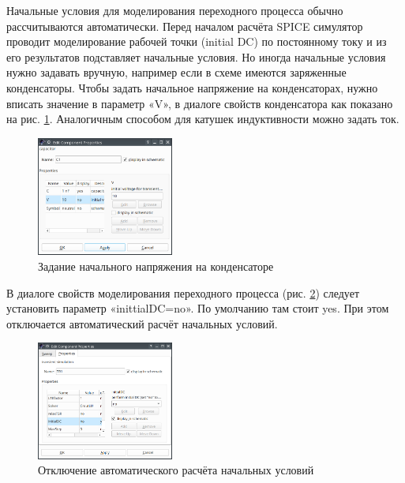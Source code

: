 \documentclass[a4paper,12pt]{article}
\begin{document}
Начальные условия для моделирования переходного процесса обычно рассчитываются автоматически. Перед началом расчёта SPICE симулятор проводит моделирование рабочей точки (initial DC) по постоянному току и из его результатов подставляет начальные условия.  Но иногда начальные условия нужно задавать вручную, например если в схеме имеются заряженные конденсаторы. Чтобы задать начальное напряжение на конденсаторах, нужно вписать значение в параметр «V», в диалоге свойств конденсатора как показано на рис. \ref{fig:cap_init}. Аналогичным способом для катушек индуктивности можно задать ток.

    \begin{figure}[!ht]
    \begin{center}
        \includegraphics[width=0.4\textwidth]{img/cap_init.png}
    \end{center}
    \caption{Задание начального напряжения на конденсаторе} \label{fig:cap_init}
    \end{figure}
    
В диалоге свойств моделирования переходного процесса (рис. \ref{fig:init_dc}) следует установить параметр «inittialDC=no». По умолчанию там стоит yes. При этом отключается автоматический расчёт начальных условий.

    \begin{figure}[!ht]
    \begin{center}
        \includegraphics[width=0.4\textwidth]{img/init_dc.png}
    \end{center}
    \caption{Отключение автоматического расчёта начальных условий} \label{fig:init_dc}
    \end{figure}
\end{document}
